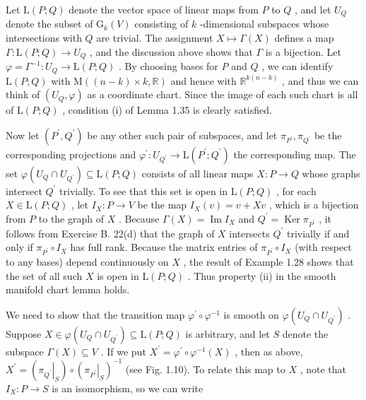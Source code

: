 \begin{example}
Let $\mathrm{L}\left( {P;Q}\right)$ denote the vector space of linear maps from $P$ to $Q$ , and let ${U}_{Q}$ denote the subset of ${\mathrm{G}}_{k}\left( V\right)$ consisting of $k$ -dimensional subspaces whose intersections with $Q$ are trivial. The assignment $X \mapsto  \Gamma \left( X\right)$ defines a map $\Gamma  : \mathrm{L}\left( {P;Q}\right)  \rightarrow  {U}_{Q}$ , and the discussion above shows that $\Gamma$ is a bijection. Let $\varphi  = {\Gamma }^{-1} : {U}_{Q} \rightarrow  \mathrm{L}\left( {P;Q}\right)$ . By choosing bases for $P$ and $Q$ , we can identify $\mathrm{L}\left( {P;Q}\right)$ with $\mathrm{M}\left( {\left( {n - k}\right)  \times  k,\mathbb{R}}\right)$ and hence with ${\mathbb{R}}^{k\left( {n - k}\right) }$ , and thus we can think of $\left( {{U}_{Q},\varphi }\right)$ as a coordinate chart. Since the image of each such chart is all of $\mathrm{L}\left( {P;Q}\right)$ , condition (i) of Lemma 1.35 is clearly satisfied.

Now let $\left( {{P}^{\prime },{Q}^{\prime }}\right)$ be any other such pair of subspaces, and let ${\pi }_{{P}^{\prime }},{\pi }_{{Q}^{\prime }}$ be the corresponding projections and ${\varphi }^{\prime } : {U}_{{Q}^{\prime }} \rightarrow  \mathrm{L}\left( {{P}^{\prime };{Q}^{\prime }}\right)$ the corresponding map. The set $\varphi \left( {{U}_{Q} \cap  {U}_{{Q}^{\prime }}}\right)  \subseteq  \mathrm{L}\left( {P;Q}\right)$ consists of all linear maps $X : P \rightarrow  Q$ whose graphs intersect ${Q}^{\prime }$ trivially. To see that this set is open in $\mathrm{L}\left( {P;Q}\right)$ , for each $X \in  \mathrm{L}\left( {P;Q}\right)$ , let ${I}_{X} : P \rightarrow  V$ be the map ${I}_{X}\left( v\right)  = v + {Xv}$ , which is a bijection from $P$ to the graph of $X$ . Because $\Gamma \left( X\right)  = \operatorname{Im}{I}_{X}$ and ${Q}^{\prime } = \operatorname{Ker}{\pi }_{{P}^{\prime }}$ , it follows from Exercise B. 22(d) that the graph of $X$ intersects ${Q}^{\prime }$ trivially if and only if ${\pi }_{{P}^{\prime }} \circ  {I}_{X}$ has full rank. Because the matrix entries of ${\pi }_{{P}^{\prime }} \circ  {I}_{X}$ (with respect to any bases) depend continuously on $X$ , the result of Example 1.28 shows that the set of all such $X$ is open in $\mathrm{L}\left( {P;Q}\right)$ . Thus property (ii) in the smooth manifold chart lemma holds.

We need to show that the transition map ${\varphi }^{\prime } \circ  {\varphi }^{-1}$ is smooth on $\varphi \left( {{U}_{Q} \cap  {U}_{{Q}^{\prime }}}\right)$ . Suppose $X \in  \varphi \left( {{U}_{Q} \cap  {U}_{{Q}^{\prime }}}\right)  \subseteq  \mathrm{L}\left( {P;Q}\right)$ is arbitrary, and let $S$ denote the subspace $\Gamma \left( X\right)  \subseteq  V$ . If we put ${X}^{\prime } = {\varphi }^{\prime } \circ  {\varphi }^{-1}\left( X\right)$ , then as above, ${X}^{\prime } = \left( {\left. {\pi }_{{Q}^{\prime }}\right| }_{S}\right)  \circ  {\left( {\left. {\pi }_{{P}^{\prime }}\right| }_{S}\right) }^{-1}$ (see Fig. 1.10). To relate this map to $X$ , note that ${I}_{X} : P \rightarrow  S$ is an isomorphism, so we can write


\end{example}
